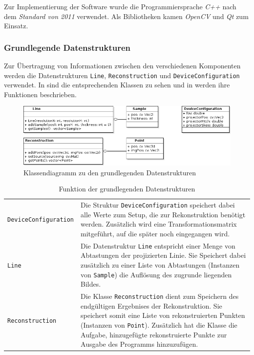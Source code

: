\documentclass[ngerman,a4paper,parskip=half]{scrartcl}
\begin{document}
Zur Implementierung der Software wurde die Programmiersprache \emph{C++} nach dem \emph{Standard von 2011} verwendet. Als Bibliotheken kamen \emph{OpenCV} und \emph{Qt} zum Einsatz.

\subsubsection{Grundlegende Datenstrukturen}

Zur Übertragung von Informationen zwischen den verschiedenen Komponenten werden die Datenstrukturen \texttt{Line}, \texttt{Reconstruction} und \texttt{DeviceConfiguration} verwendet. In  sind die entsprechenden Klassen zu sehen und in  werden ihre Funktionen beschrieben.

\begin{figure}
	\centering
	\includegraphics[width=\linewidth]{includes/classdiagram_base.png}
	\caption{Klassendiagramm zu den grundlegenden Datenstrukturen}
	\label{fig:classes_base}
\end{figure}

\begin{table}
	\centering
	\begin{tabular}{lp{10cm}}
		\texttt{DeviceConfiguration} &
			Die Struktur \texttt{DeviceConfiguration} speichert dabei alle Werte zum Setup, die zur Rekonstruktion benötigt werden. Zusätzlich wird eine Transformationsmatrix mitgeführt, auf die später noch eingegangen wird.\\[1em]
		\texttt{Line}                &
			Die Datenstruktur \texttt{Line} entspricht einer Menge von Abtastungen der projizierten Linie. Sie Speichert dabei zusätzlich zu einer Liste von Abtastungen (Instanzen von \texttt{Sample}) die Auflösung des zugrunde liegenden Bildes.\\[1em]
		\texttt{Reconstruction}      &
			Die Klasse \texttt{Reconstruction} dient zum Speichern des endgültigen Ergebnises der Rekonstruktion. Sie speichert somit eine Liste von rekonstruierten Punkten (Instanzen von \texttt{Point}). Zusätzlich hat die Klasse die Aufgabe, hinzugefügte rekonstruierte Punkte zur Ausgabe des Programms hinzuzufügen.
	\end{tabular}
	\caption{Funktion der grundlegenden Datenstrukturen}
	\label{tab:classes_base}
\end{table}
\end{document}
